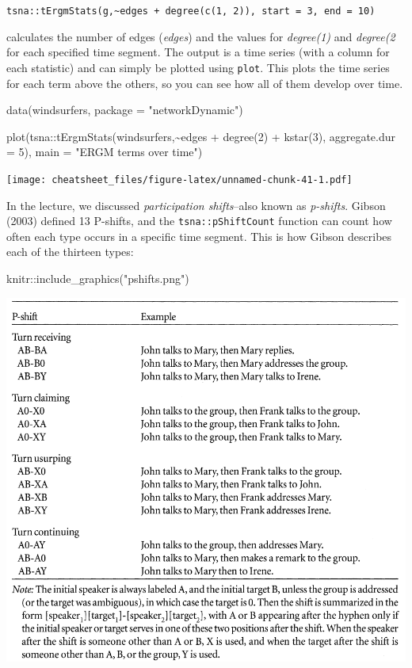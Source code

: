 \documentclass[
]{article}
\newenvironment{Shaded}{\begin{snugshade}}{\end{snugshade}}
\newcommand{\AttributeTok}[1]{\textcolor[rgb]{0.77,0.63,0.00}{#1}}
\newcommand{\DecValTok}[1]{\textcolor[rgb]{0.00,0.00,0.81}{#1}}
\newcommand{\FunctionTok}[1]{\textcolor[rgb]{0.00,0.00,0.00}{#1}}
\newcommand{\NormalTok}[1]{#1}
\newcommand{\SpecialCharTok}[1]{\textcolor[rgb]{0.00,0.00,0.00}{#1}}
\newcommand{\StringTok}[1]{\textcolor[rgb]{0.31,0.60,0.02}{#1}}
\begin{document}
\texttt{tsna::tErgmStats(g,\textquotesingle{}\textasciitilde{}edges\ +\ degree(c(1,\ 2))\textquotesingle{},\ start\ =\ 3,\ end\ =\ 10)}

calculates the number of edges (\emph{edges}) and the values for
\emph{degree(1)} and \emph{degree(2} for each specified time segment.
The output is a time series (with a column for each statistic) and can
simply be plotted using \texttt{plot}. This plots the time series for
each term above the others, so you can see how all of them develop over
time.

\begin{Shaded}
\begin{Highlighting}[]
\FunctionTok{data}\NormalTok{(windsurfers, }\AttributeTok{package =} \StringTok{"networkDynamic"}\NormalTok{)}

\FunctionTok{plot}\NormalTok{(tsna}\SpecialCharTok{::}\FunctionTok{tErgmStats}\NormalTok{(windsurfers,}\StringTok{\textquotesingle{}\textasciitilde{}edges + degree(2) + kstar(3)\textquotesingle{}}\NormalTok{,}
                      \AttributeTok{aggregate.dur =} \DecValTok{5}\NormalTok{), }\AttributeTok{main =} \StringTok{"ERGM terms over time"}\NormalTok{)}
\end{Highlighting}
\end{Shaded}

\texttt{[image: cheatsheet\_files/figure-latex/unnamed-chunk-41-1.pdf]}

In the lecture, we discussed \emph{participation shifts}--also known as
\emph{p-shifts}. Gibson (2003) defined 13 P-shifts, and the
\texttt{tsna::pShiftCount} function can count how often each type occurs
in a specific time segment. This is how Gibson describes each of the
thirteen types:

\begin{Shaded}
\begin{Highlighting}[]
\NormalTok{knitr}\SpecialCharTok{::}\FunctionTok{include\_graphics}\NormalTok{(}\StringTok{"pshifts.png"}\NormalTok{)}
\end{Highlighting}
\end{Shaded}

\includegraphics[width=12.49in]{pshifts}
\end{document}
